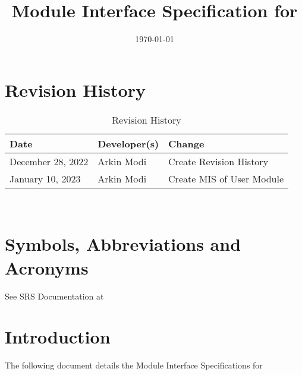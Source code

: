 \documentclass[12pt, titlepage]{article}
\begin{document}
\title{Module Interface Specification for \progname{}}

\author{\authname}

\date{\today}

\maketitle


\section{Revision History}

\begin{table}[hp]
	\caption{Revision History} \label{TblRevisionHistory}
	\begin{tabularx}{\textwidth}{llX}
		\toprule
		\textbf{Date}     & \textbf{Developer(s)} & \textbf{Change}           \\
		\midrule
		December 28, 2022 & Arkin Modi            & Create Revision History   \\
		January 10, 2023  & Arkin Modi            & Create MIS of User Module \\
		\bottomrule
	\end{tabularx}
\end{table}

~\newpage

\section{Symbols, Abbreviations and Acronyms}

See SRS Documentation at 


\newpage

\tableofcontents

\newpage

\listoftables

\listoffigures

\newpage


\section{Introduction}

The following document details the Module Interface Specifications for 
\end{document}

